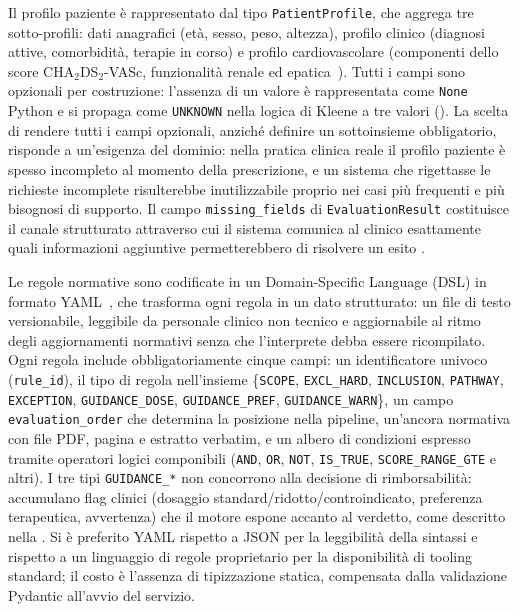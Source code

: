 Il profilo paziente è rappresentato dal tipo \texttt{PatientProfile},
che aggrega tre sotto-profili: dati anagrafici (età, sesso, peso, altezza),
profilo clinico (diagnosi attive, comorbidità, terapie in corso) e profilo
cardiovascolare (componenti dello score CHA$_2$DS$_2$-VASc, funzionalità
renale ed epatica~\cite{lip2010cha2ds2vasc}).
Tutti i campi sono opzionali per costruzione: l'assenza di un valore è
rappresentata come \texttt{None} Python e si propaga come \texttt{UNKNOWN}
nella logica di Kleene a tre valori ().
La scelta di rendere tutti i campi opzionali, anziché definire un sottoinsieme
obbligatorio, risponde a un'esigenza del dominio: nella pratica clinica reale
il profilo paziente è spesso incompleto al momento della prescrizione, e
un sistema che rigettasse le richieste incomplete risulterebbe inutilizzabile
proprio nei casi più frequenti e più bisognosi di supporto.
Il campo \texttt{missing\_fields} di \texttt{EvaluationResult} costituisce
il canale strutturato attraverso cui il sistema comunica al clinico
esattamente quali informazioni aggiuntive permetterebbero di risolvere
un esito .

Le regole normative sono codificate in un Domain-Specific Language (DSL)
in formato YAML~\cite{yamlspec}, che trasforma ogni regola in un dato
strutturato: un file di testo versionabile, leggibile da personale clinico
non tecnico e aggiornabile al ritmo degli aggiornamenti normativi senza
che l'interprete debba essere ricompilato.
Ogni regola include obbligatoriamente cinque campi: un identificatore univoco
(\texttt{rule\_id}), il tipo di regola nell'insieme
\{\texttt{SCOPE}, \texttt{EXCL\_HARD}, \texttt{INCLUSION}, \texttt{PATHWAY},
\texttt{EXCEPTION}, \texttt{GUIDANCE\_DOSE}, \texttt{GUIDANCE\_PREF},
\texttt{GUIDANCE\_WARN}\}, un campo \texttt{evaluation\_order} che determina
la posizione nella pipeline, un'ancora normativa con file PDF, pagina
e estratto verbatim, e un albero di condizioni espresso tramite operatori
logici componibili (\texttt{AND}, \texttt{OR}, \texttt{NOT}, \texttt{IS\_TRUE},
\texttt{SCORE\_RANGE\_GTE} e altri). I tre tipi \texttt{GUIDANCE\_*} non
concorrono alla decisione di rimborsabilità: accumulano flag clinici
(dosaggio standard/ridotto/controindicato, preferenza terapeutica,
avvertenza) che il motore espone accanto al verdetto, come descritto
nella .
Si è preferito YAML rispetto a JSON per la leggibilità della sintassi e
rispetto a un linguaggio di regole proprietario per la disponibilità di
tooling standard; il costo è l'assenza di tipizzazione statica,
compensata dalla validazione Pydantic all'avvio del servizio.

